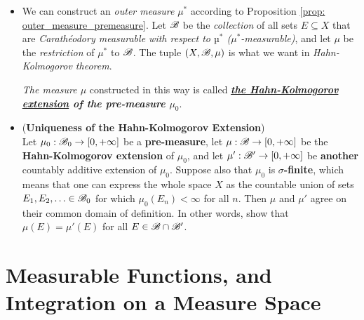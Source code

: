 \documentclass[11pt]{article}
\begin{document}
\begin{itemize}
\item \begin{remark}
We can construct an \emph{outer measure} $\mu^{*}$ according to Proposition \ref{prop: outer_measure_premeasure}. Let ${\mathscr B}$ be the \emph{collection} of all sets $E \subseteq X$ that are \textit{Carath\'eodory measurable with respect to $µ^{*}$ ($\mu^{*}$-measurable)}, and let $\mu$ be the \emph{restriction} of $\mu^{*}$  to ${\mathscr B}$. The tuple $(X, {\mathscr B}, \mu)$ is what we want in \emph{Hahn-Kolmogorov theorem}. 

\emph{The measure $\mu$} constructed in this way is called \emph{\textbf{ \underline{the Hahn-Kolmogorov extension} of the pre-measure $\mu_0$}}. 
\end{remark}

\item \begin{proposition} (\textbf{Uniqueness of the Hahn-Kolmogorov Extension})\\
Let $\mu_0 : {\mathscr B}_0 \rightarrow [0, +\infty]$ be a \textbf{pre-measure}, let $\mu : {\mathscr B} \rightarrow [0, +\infty]$ be the \textbf{Hahn-Kolmogorov extension} of $\mu_0$, and let $\mu' : {\mathscr B}' \rightarrow  [0, +\infty]$ be \textbf{another} countably additive extension of $\mu_0$. Suppose also that $\mu_0$ is \textbf{$\sigma$-finite}, which means that one can express the whole space $X$ as the countable union of sets $E_1, E_2, \ldots \in {\mathscr B}_{0}$ for which $\mu_0(E_n) < \infty$ for all $n$. Then $\mu$ and $\mu'$ agree on their common domain of definition. In other words, show that  $\mu(E) = \mu'(E)$ for all $E \in {\mathscr B} \cap {\mathscr B}'$.
\end{proposition} 
\end{itemize}
\newpage
\section{Measurable Functions, and Integration on a Measure Space}
\end{document}
